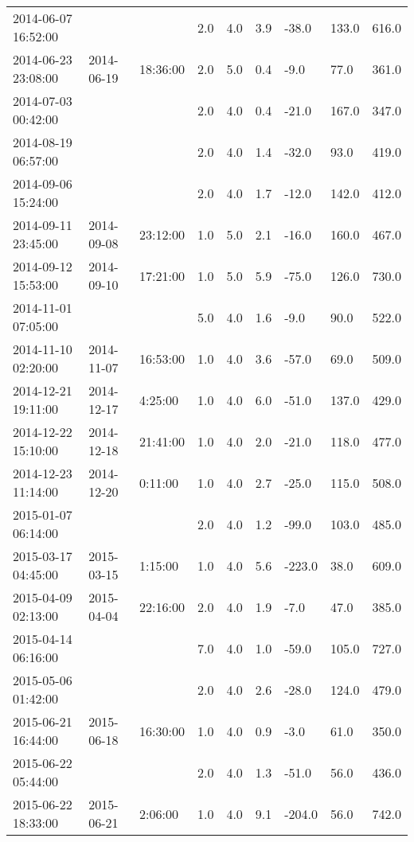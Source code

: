 \begin{longtable}{lllllllll}
        2014-06-07 16:52:00 & ~ & ~ & 2.0 & 4.0 & 3.9 & -38.0 & 133.0 & 616.0 \\ 
        2014-06-23 23:08:00 & 2014-06-19 & 18:36:00 & 2.0 & 5.0 & 0.4 & -9.0 & 77.0 & 361.0 \\ 
        2014-07-03 00:42:00 & ~ & ~ & 2.0 & 4.0 & 0.4 & -21.0 & 167.0 & 347.0 \\ 
        2014-08-19 06:57:00 & ~ & ~ & 2.0 & 4.0 & 1.4 & -32.0 & 93.0 & 419.0 \\ 
        2014-09-06 15:24:00 & ~ & ~ & 2.0 & 4.0 & 1.7 & -12.0 & 142.0 & 412.0 \\ 
        2014-09-11 23:45:00 & 2014-09-08 & 23:12:00 & 1.0 & 5.0 & 2.1 & -16.0 & 160.0 & 467.0 \\ 
        2014-09-12 15:53:00 & 2014-09-10 & 17:21:00 & 1.0 & 5.0 & 5.9 & -75.0 & 126.0 & 730.0 \\ 
        2014-11-01 07:05:00 & ~ & ~ & 5.0 & 4.0 & 1.6 & -9.0 & 90.0 & 522.0 \\ 
        2014-11-10 02:20:00 & 2014-11-07 & 16:53:00 & 1.0 & 4.0 & 3.6 & -57.0 & 69.0 & 509.0 \\ 
        2014-12-21 19:11:00 & 2014-12-17 & 4:25:00 & 1.0 & 4.0 & 6.0 & -51.0 & 137.0 & 429.0 \\ 
        2014-12-22 15:10:00 & 2014-12-18 & 21:41:00 & 1.0 & 4.0 & 2.0 & -21.0 & 118.0 & 477.0 \\ 
        2014-12-23 11:14:00 & 2014-12-20 & 0:11:00 & 1.0 & 4.0 & 2.7 & -25.0 & 115.0 & 508.0 \\ 
        2015-01-07 06:14:00 & ~ & ~ & 2.0 & 4.0 & 1.2 & -99.0 & 103.0 & 485.0 \\ 
        2015-03-17 04:45:00 & 2015-03-15 & 1:15:00 & 1.0 & 4.0 & 5.6 & -223.0 & 38.0 & 609.0 \\ 
        2015-04-09 02:13:00 & 2015-04-04 & 22:16:00 & 2.0 & 4.0 & 1.9 & -7.0 & 47.0 & 385.0 \\ 
        2015-04-14 06:16:00 & ~ & ~ & 7.0 & 4.0 & 1.0 & -59.0 & 105.0 & 727.0 \\ 
        2015-05-06 01:42:00 & ~ & ~ & 2.0 & 4.0 & 2.6 & -28.0 & 124.0 & 479.0 \\ 
        2015-06-21 16:44:00 & 2015-06-18 & 16:30:00 & 1.0 & 4.0 & 0.9 & -3.0 & 61.0 & 350.0 \\ 
        2015-06-22 05:44:00 & ~ & ~ & 2.0 & 4.0 & 1.3 & -51.0 & 56.0 & 436.0 \\ 
        2015-06-22 18:33:00 & 2015-06-21 & 2:06:00 & 1.0 & 4.0 & 9.1 & -204.0 & 56.0 & 742.0 \\ 

\end{longtable}
